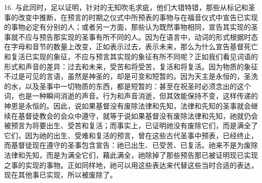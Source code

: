 16. 与此同时，足以证明，针对的无知吹毛求疵，他们大错特错，那些从标记和圣事的改变中推断，在预言的时期之仪式中所预表的事物与在福音仪式中宣告已实现的事物必定有分别的人；或者另一方面，那些认为既然事物相同，宣告其实现的圣事就不应与预告那实现的圣事有所不同的人。因为在语言中，动词的形式根据时态在字母和音节的数量上改变，正如表示过去，表示未来，那么为什么宣告基督死亡和复活已实现的象征，不应与预言其实现的象征有所不同呢？正如我们看见词语的形式和声音的差异：过去和未来，受苦和将受苦，复活和将复活。因为物质的象征不过是可见的言语，虽然是神圣的，却是可变和短暂的。因为天主是永恒的，圣洗的水，以及圣事中一切物质的东西，都是短暂的：甚至在祝圣时必须念出的这个词，也是一种瞬间消逝的声音。行为和声音消逝，但其效能保持不变，这样传递的神恩是永恒的。因此，说如果基督没有废除法律和先知，法律和先知的圣事就会继续在基督徒教会的会众中遵守，就等于说如果基督没有废除法律和先知，祂就仍会被预言为将要出生、受苦和复活；而事实上，已证明祂没有废除它们，而是满全了它们，因为祂的出生、受难和复活的预言，曾在这些古代圣事中预表，已经终止，而基督徒现在遵守的圣事包含宣告：祂已出生、已受苦、已复活。祂来不是为废除法律和先知，而是为满全它们，藉此满全，祂除掉了那些预告那已被证明现已实现之事的实现的事物。正如同样地，祂可以用这些表达来代替这些当时合适的表达，现在其他事已实现，所以被废除了。\par

